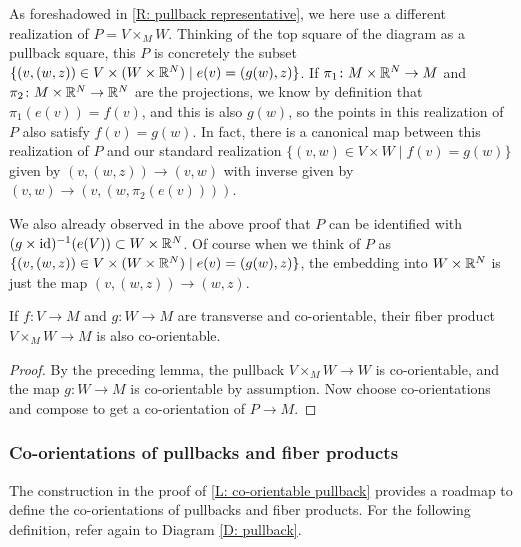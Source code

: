\begin{remark}\label{R: pullback representative 2}
	As foreshadowed in \cref{R: pullback representative}, we here use a different realization of $P = V \times_M W$.
	Thinking of the top square of the diagram as a pullback square, this $P$ is concretely the subset $\{(v,(w,z)) \in V \times (W \times \mathbb{R}^N) \mid e(v) = (g(w),z)\}$.
	If $\pi_1 \colon M \times \mathbb{R}^N \to M$ and $\pi_2 \colon M \times \mathbb{R}^N \to \mathbb{R}^N$ are the projections, we know by definition that $\pi_1(e(v)) = f(v)$, and this is also $g(w)$, so the points in this realization of $P$ also satisfy $f(v) = g(w)$.
	In fact, there is a canonical map between this realization of $P$ and our standard realization $\{(v,w) \in V \times W \mid f(v) = g(w)\}$ given by $(v,(w,z)) \to (v,w)$ with inverse given by $(v,w) \to (v,(w,\pi_2(e(v))))$.

	We also already observed in the above proof that $P$ can be identified with $(g \times \mathrm{id})^{-1}(e(V)) \subset W \times \mathbb{R}^N$.
	Of course when we think of $P$ as $\{(v,(w,z)) \in V \times (W \times \mathbb{R}^N) \mid e(v) = (g(w),z)\}$, the embedding into $W \times \mathbb{R}^N$ is just the map $(v,(w,z)) \to (w,z)$.
\end{remark}

\begin{corollary}
	If $f \colon V \to M$ and $g \colon W \to M$ are transverse and co-orientable, their fiber product $V \times_M W \to M$ is also co-orientable.
\end{corollary}

\begin{proof}
	By the preceding lemma, the pullback $V \times_M W \to W$ is co-orientable, and the map $g \colon W \to M$ is co-orientable by assumption.
	Now choose co-orientations and compose to get a co-orientation of $P \to M$.
\end{proof}

\subsubsection{Co-orientations of pullbacks and fiber products}\label{S: co-orientation of pullbacks}

The construction in the proof of \cref{L: co-orientable pullback} provides a roadmap to define the co-orientations of pullbacks and fiber products.
For the following definition, refer again to Diagram \eqref{D: pullback}.

